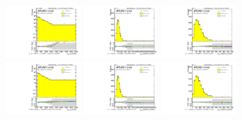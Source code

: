 \begin{figure}[htbp!]
\begin{center}
\includegraphics[width=0.25\textwidth,angle=-90]{figures/boosted/Reweight/Fits/Moriond_bkg_3_NoTag_4Trk_subl_Incl_leadHCand_Pt_m_1.pdf}
\includegraphics[width=0.25\textwidth,angle=-90]{figures/boosted/Reweight/Fits/Moriond_bkg_3_NoTag_4Trk_subl_Incl_leadHCand_trk0_Pt.pdf}
\includegraphics[width=0.25\textwidth,angle=-90]{figures/boosted/Reweight/Fits/Moriond_bkg_3_NoTag_4Trk_subl_Incl_leadHCand_trk1_Pt.pdf} \\
\includegraphics[width=0.25\textwidth,angle=-90]{figures/boosted/Reweight/Fits/Moriond_bkg_9_NoTag_4Trk_subl_Incl_leadHCand_Pt_m_1.pdf}
\includegraphics[width=0.25\textwidth,angle=-90]{figures/boosted/Reweight/Fits/Moriond_bkg_9_NoTag_4Trk_subl_Incl_leadHCand_trk0_Pt.pdf}
\includegraphics[width=0.25\textwidth,angle=-90]{figures/boosted/Reweight/Fits/Moriond_bkg_9_NoTag_4Trk_subl_Incl_leadHCand_trk1_Pt.pdf} \\

\end{center}
\end{figure}
